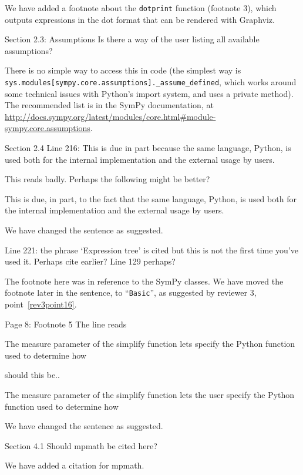 \documentclass[answers,12pt]{exam}
\begin{document}
\begin{questions}
\begin{solution}
We have added a footnote about the \texttt{dotprint} function (footnote 3),
which outputs expressions in the dot format that can be rendered with Graphviz.
\end{solution}

\question Section 2.3: Assumptions
Is there a way of the user listing all available assumptions?

\begin{solution}
There is no simple way to access this in code (the simplest way is
\texttt{sys.\allowbreak{}modules[\allowbreak{}\textquotesingle{}sympy.core.assumptions\textquotesingle{}].\allowbreak{}\_assume\_defined}, which works
around some technical issues with Python's import system, and uses a
private method). The recommended list is in the SymPy documentation, at
\url{http://docs.sympy.org/latest/modules/core.html#module-sympy.core.assumptions}.
\end{solution}
\question Section 2.4
Line 216: This is due in part because the same language, Python, is used both for the internal implementation and the external usage by users.

This reads badly. Perhaps the following might be better?

This is due, in part, to the fact that the same language, Python, is used both for the internal implementation and the external usage by users.

\begin{solution}
We have changed the sentence as suggested.
\end{solution}
\question Line 221:
the phrase `Expression tree' is cited but this is not the first time you've used it. Perhaps cite earlier? Line 129 perhaps?

\begin{solution}
The footnote here was in reference to the SymPy classes. We have moved the
footnote later in the sentence, to ``\texttt{Basic}'', as suggested
by reviewer 3, point~\ref{rev3point16}.
\end{solution}
\question Page 8: Footnote 5
The line reads

The measure parameter of the simplify function lets specify the Python function used to determine how

should this be..

The measure parameter of the simplify function lets the user specify the Python function used to determine how

\begin{solution}
We have changed the sentence as suggested.
\end{solution}
\question Section 4.1
Should mpmath be cited here?

\begin{solution}
We have added a citation for mpmath.
\end{solution}
\end{questions}
\end{document}
